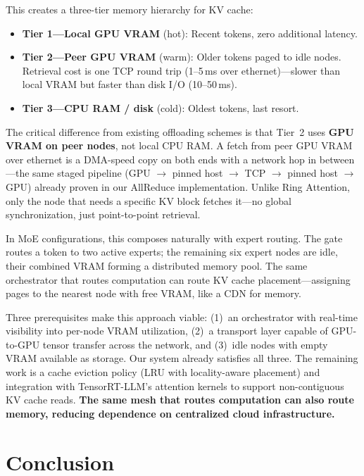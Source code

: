 \documentclass[10pt,twocolumn]{article}
\begin{document}
This creates a three-tier memory hierarchy for KV cache:

\begin{itemize}[nosep,leftmargin=*]
  \item \textbf{Tier 1---Local GPU VRAM} (hot): Recent tokens, zero
    additional latency.
  \item \textbf{Tier 2---Peer GPU VRAM} (warm): Older tokens paged to
    idle nodes.  Retrieval cost is one TCP round trip (1--5\,ms over
    ethernet)---slower than local VRAM but faster than disk I/O
    (10--50\,ms).
  \item \textbf{Tier 3---CPU RAM / disk} (cold): Oldest tokens, last
    resort.
\end{itemize}

The critical difference from existing offloading schemes is that Tier~2
uses \textbf{GPU VRAM on peer nodes}, not local CPU RAM\@.  A fetch from
peer GPU VRAM over ethernet is a DMA-speed copy on both ends with a
network hop in between---the same staged pipeline (GPU $\to$ pinned host
$\to$ TCP $\to$ pinned host $\to$ GPU) already proven in our AllReduce
implementation.  Unlike Ring Attention, only the node that needs a specific
KV block fetches it---no global synchronization, just point-to-point
retrieval.

In MoE configurations, this composes naturally with expert routing.  The
gate routes a token to two active experts; the remaining six expert nodes
are idle, their combined VRAM forming a distributed memory pool.  The same
orchestrator that routes computation can route KV cache
placement---assigning pages to the nearest node with free VRAM, like a CDN
for memory.

Three prerequisites make this approach viable: (1)~an orchestrator with
real-time visibility into per-node VRAM utilization, (2)~a transport layer
capable of GPU-to-GPU tensor transfer across the network, and (3)~idle
nodes with empty VRAM available as storage.  Our system already satisfies
all three.  The remaining work is a cache eviction policy (LRU with
locality-aware placement) and integration with TensorRT-LLM's attention
kernels to support non-contiguous KV cache reads.  \textbf{The same mesh
that routes computation can also route memory, reducing dependence on
centralized cloud infrastructure.}

\section{Conclusion}\label{sec:conclusion}
\end{document}
